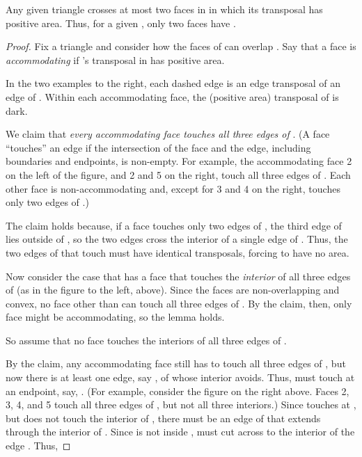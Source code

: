 \documentclass[final]{siamltex}
\newcommand{\Picture}[1]{}
\newcommand{\xfigpdf}[1]{\Picture{#1.pdf_t}}
\newcommand{\xfig}[1]{\xfigpdf{#1}}
\begin{document}
\begin{lemma}\label{lemma:transposals}
  Any given triangle  crosses at most two faces  in 
  in which its transposal  has positive area.
  Thus, for a given , only two faces  have
  .
\end{lemma}

\begin{proof}
Fix a triangle  and consider how the faces of  can overlap .
Say that a face  is {\em accommodating} if 's transposal  in  has positive area.

\begin{window}[0,r,{\scalebox{.5}{\xfig{transposal-configs}}},{}]
  In the two examples to the right,
  each dashed edge is an edge transposal of an edge of .
  Within each accommodating face, the (positive area) transposal of  is dark.

  \hspace*{\parindent}We claim that {\em every accommodating face touches all three edges of }.
  (A face ``touches'' an edge if the intersection of the face and the edge,
  including boundaries and endpoints, is non-empty.
  For example, the accommodating face 2 on the left of the figure, and 2 and 5 on the right, 
  touch all three edges of .  
  Each other face is non-accommodating and, 
  except for 3 and 4 on the right, touches only two edges of .)
\end{window}

The claim holds because, if a face  touches only two edges of ,
the third edge of  lies outside of ,
so the two edges cross the interior of a single edge of .
Thus, the two edges of  that touch  must have identical transposals,
forcing  to have no area.

Now consider the case that  has a face  that touches the {\em interior}
of all three edges of  (as in the figure to the left, above).
Since the faces are non-overlapping and convex,
no face other than  can touch all three edges of .
By the claim, then, only face  might be accommodating, so the lemma holds.

So assume that no face touches the interiors of all three edges of .

By the claim, any accommodating face  still has to touch all three edges of ,
but now there is at least one edge, say , of  whose interior  avoids.
Thus,  must touch  at an endpoint, say, .
(For example, consider the figure on the right above.
Faces 2, 3, 4, and 5 touch all three edges of , but not all three interiors.)
Since  touches  at , but does not touch the interior of ,
there must be an edge  of  that extends through the interior of .
Since  is not inside ,  must cut across  to the interior of the edge .
Thus, 



\end{proof}
\end{document}

